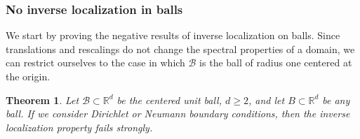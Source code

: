 \documentclass{amsart}
\newtheorem{theorem}{Theorem}[section]
\theoremstyle{definition}
\theoremstyle{remark}
\renewcommand\geq\geqslant
\numberwithin{equation}{section}
\theoremstyle{definition}
\theoremstyle{remark}
\begin{document}
\subsubsection{No inverse localization in balls}\label{NOILBalls}
We start by proving the negative results of inverse localization on balls. Since translations and rescalings do not change the spectral properties of a domain, we can restrict ourselves to the case in which $\mathcal{B}$ is the ball of radius one centered at the origin. 
\begin{theorem}
	Let $\mathcal{B}\subset\mathbb{R}^d$ be the centered unit ball, $d\geq2$, and let $B\subset\mathbb{R}^d$ be any ball. If we consider Dirichlet or Neumann boundary conditions, then the inverse localization property fails strongly. 
\end{theorem}
\end{document}
